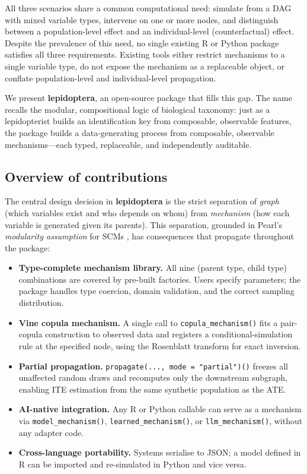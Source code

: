 \documentclass[12pt,a4paper]{article}
\newcommand{\pkg}[1]{\textbf{#1}}
\newcommand{\proglang}[1]{\textsf{#1}}
\newcommand{\fct}[1]{\mbox{\texttt{#1()}}}
\begin{document}
All three scenarios share a common computational need: simulate from a DAG with
mixed variable types, intervene on one or more nodes, and distinguish between a
population-level effect and an individual-level (counterfactual) effect. Despite
the prevalence of this need, no single existing \proglang{R} or \proglang{Python}
package satisfies all three requirements. Existing tools either restrict mechanisms
to a single variable type, do not expose the mechanism as a replaceable object, or
conflate population-level and individual-level propagation.

We present \pkg{lepidoptera}, an open-source package that fills this gap. The name
recalls the modular, compositional logic of biological taxonomy: just as a
lepidopterist builds an identification key from composable, observable features,
the package builds a data-generating process from composable, observable
mechanisms---each typed, replaceable, and independently auditable.

\subsection{Overview of contributions}

The central design decision in \pkg{lepidoptera} is the strict separation of
\emph{graph} (which variables exist and who depends on whom) from
\emph{mechanism} (how each variable is generated given its parents). This
separation, grounded in Pearl's \emph{modularity assumption} for SCMs
\citep{pearl2009causality}, has consequences that propagate throughout the package:

\begin{itemize}[leftmargin=1.8em]
  \item \textbf{Type-complete mechanism library.} All nine
        (parent type, child type) combinations are covered by pre-built factories.
        Users specify parameters; the package handles type coercion, domain
        validation, and the correct sampling distribution.
  \item \textbf{Vine copula mechanism.} A single call to
        \fct{copula\_mechanism} fits a pair-copula construction to observed data
        and registers a conditional-simulation rule at the specified node, using
        the Rosenblatt transform \citep{rosenblatt1952remarks} for exact
        inversion.
  \item \textbf{Partial propagation.} \fct{propagate(..., mode = "partial")}
        freezes all unaffected random draws and recomputes only the downstream
        subgraph, enabling ITE estimation from the same synthetic population as
        the ATE.
  \item \textbf{AI-native integration.} Any \proglang{R} or \proglang{Python}
        callable can serve as a mechanism via \fct{model\_mechanism},
        \fct{learned\_mechanism}, or \fct{llm\_mechanism}, without any adapter
        code.
  \item \textbf{Cross-language portability.} Systems serialise to JSON; a model
        defined in \proglang{R} can be imported and re-simulated in
        \proglang{Python} and vice versa.
\end{itemize}
\end{document}
